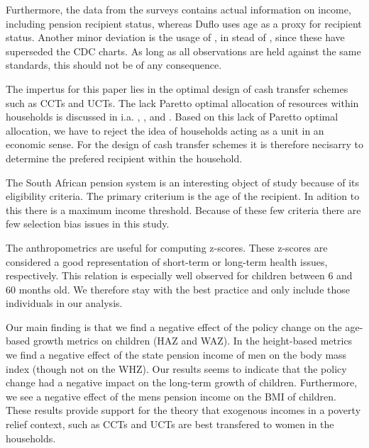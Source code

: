 \begin{refsection}
Furthermore, the data from the \textcite{saldru2008nids,saldru2012nids} surveys contains actual information on income,
including pension recipient status, whereas Duflo uses age as a proxy for recipient status.
Another minor deviation is the usage of \textcite[WHO Child Growth Standards]{who2006child},
in stead of \textcite[CDC Growth Charts: United States]{nchs2000cdc}, since these have superseded the CDC charts.
As long as all observations are held against the same standards, this should not be of any consequence.

The impertus for this paper lies in the optimal design of cash transfer schemes such as CCTs and UCTs.
The lack Paretto optimal allocation of resources within households is discussed in i.a.
\textcite{udry1995gender}, \textcite{udry1996gender}, and \textcite{duflo2004intrahousehold}.
Based on this lack of Paretto optimal allocation,
we have to reject the idea of households acting as a unit in an economic sense.
For the design of cash transfer schemes it is therefore necisarry to determine the prefered recipient within the household.

The South African pension system is an interesting object of study because of its eligibility criteria.
The primary criterium is the age of the recipient.
In adition to this there is a maximum income threshold.
Because of these few criteria there are few selection bias issues in this study.

The anthropometrics are useful for computing z-scores.
These z-scores are considered a good representation of short-term or long-term health issues, respectively.
This relation is especially well observed for children between 6 and 60 months old.
We therefore stay with the best practice and only include those individuals in our analysis.



Our main finding is that we find a negative effect of the policy change on the age-based growth metrics on children (HAZ and WAZ).
In the height-based metrics we find a negative effect of the state pension income of men on the body mass index (though not on the WHZ).
Our results seems to indicate that the policy change had a negative impact on the long-term growth of children.
Furthermore, we see a negative effect of the mens pension income on the BMI of children.
These results provide support for the theory that exogenous incomes in a poverty relief context,
such as CCTs and UCTs are best transfered to women in the households.


\end{refsection}
